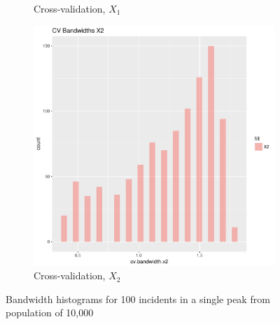 \begin{figure}[htbp]
\begin{subfigure}[b]{0.3\textwidth}
    \caption{Cross-validation, \(X_1\)}
    \label{fig:bandwidths_x1:unif_100_1.0_1h:x1}
    \end{subfigure}
    \begin{subfigure}[b]{0.3\textwidth}
    \includegraphics[width=\textwidth]{results/unif_100_1.0_1h/output/bandwidths-x2}
    \caption{Cross-validation, \(X_2\)}
    \label{fig:bandwidths_x1:unif_100_1.0_1h:x2}
    \end{subfigure}
    \caption{Bandwidth histograms for 100 incidents in a single peak from population of 10,000}
\end{figure}

